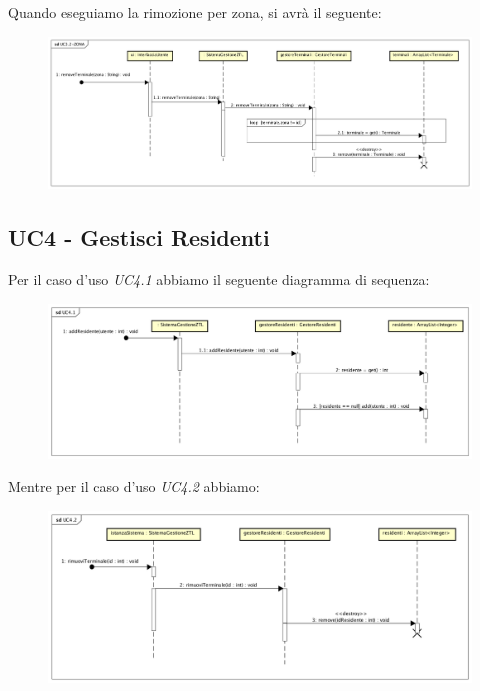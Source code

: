 \documentclass[12pt, letterpaper]{article}
\begin{document}
\noindent
Quando eseguiamo la rimozione per zona, si avrà il seguente:

\begin{figure}[H]
    \centering
    \includegraphics[scale=0.25]{UC3.2-ZONA-ID}
\end{figure} 

\subsection{UC4 - Gestisci Residenti}
Per il caso d'uso \emph{UC4.1} abbiamo il seguente 
diagramma di sequenza:
\begin{figure}[H]
    \centering
    \includegraphics[scale=0.30]{UC4.1-ID}
\end{figure} 

\noindent
Mentre per il caso d'uso \emph{UC4.2} abbiamo:
\begin{figure}[H]
    \centering
    \includegraphics[scale=0.30]{UC4.2-ID}
\end{figure} 
\end{document}

